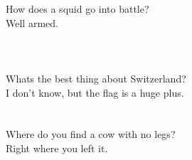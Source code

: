 
\usepackage{blindtext}



How does a squid go into battle?\\
Well armed.\\\\

\blindtext
\blindtext \\\\



Whats the best thing about Switzerland?\\
I don't know, but the flag is a huge plus.\\


\blindtext
\blindtext\\\\

Where do you find a cow with no legs?\\
Right where you left it.\\

